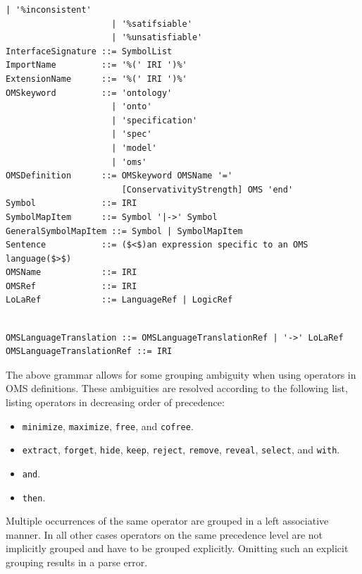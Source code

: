 \documentclass[10pt,fleqn,final]{scrreprt}
\newcommand*{\syntax}[1]{\texttt{#1}}
\newenvironment{definitions}[0]{\medskip }{}
\begin{document}
\begin{definitions}
\begin{lstlisting}[language=ebnf,escapeinside={()},mathescape]
                     | '%inconsistent'
                     | '%satifsiable'
                     | '%unsatisfiable'
InterfaceSignature ::= SymbolList
ImportName         ::= '%(' IRI ')%'
ExtensionName      ::= '%(' IRI ')%'
OMSkeyword         ::= 'ontology'
                     | 'onto'
                     | 'specification'
                     | 'spec'
                     | 'model'
                     | 'oms'
OMSDefinition      ::= OMSkeyword OMSName '='
                       [ConservativityStrength] OMS 'end'
Symbol             ::= IRI
SymbolMapItem      ::= Symbol '|->' Symbol
GeneralSymbolMapItem ::= Symbol | SymbolMapItem
Sentence           ::= ($<$)an expression specific to an OMS language($>$) 
OMSName            ::= IRI
OMSRef             ::= IRI
LoLaRef            ::= LanguageRef | LogicRef
\end{lstlisting}


\begin{lstlisting}[language=ebnf,mathescape]

OMSLanguageTranslation ::= OMSLanguageTranslationRef | '->' LoLaRef
OMSLanguageTranslationRef ::= IRI
\end{lstlisting}



The above grammar allows for some grouping ambiguity when using operators in
OMS definitions. These ambiguities are resolved according to the following
list, listing operators in decreasing order of precedence:
\begin{itemize}
  \item \syntax{minimize}, \syntax{maximize}, \syntax{free}, and \syntax{cofree}. 
  \item \syntax{extract}, \syntax{forget}, \syntax{hide}, \syntax{keep},
    \syntax{reject}, \syntax{remove}, \syntax{reveal}, \syntax{select}, and
    \syntax{with}.
  \item \syntax{and}.
  \item \syntax{then}.
\end{itemize}
Multiple occurrences of the same operator are grouped in a left associative
manner. In all other cases operators on the same precedence level are not
implicitly grouped and have to be grouped explicitly. Omitting such an explicit
grouping results in a parse error.





\end{definitions}
\end{document}
